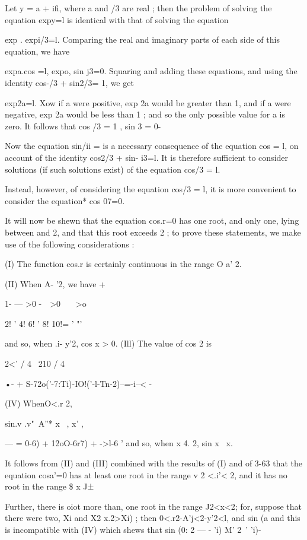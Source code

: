 Let y = a + ifi, where a and /3 are real ; then the problem of solving the equation 
expy=l is identical with that of solving the equation 

exp  . expi/3=l. 
Comparing the real and imaginary parts of each side of this equation, we have 

expa.cos =l, expo, sin j3=0. 
Squaring and adding these equations, and using the identity cos-/3 + sin2/3= 1, we get 

exp2a=l. 
Xow if a were positive, exp 2a would be greater than 1, and if a were negative, exp 2a 
would be less than 1 ; and so the only possible value for a is zero. 
It follows that cos /3 = 1 , sin 3 = 0- 

Now the equation sin/ii = is a necessary consequence of the equation cos  = l, on 
account of the identity cos2/3 + sin- i3=l. It is therefore sufficient to consider solutions 
(if such solutions exist) of the equation cos/3 = l. 

Instead, however, of considering the equation cos/3 = l, it is more convenient to 
consider the equation* cos 07=0. 

It will now be shewn that the equation cos.r=0 has one root, and only one, lying 
between and 2, and that this root exceeds  2 ; to prove these statements, we make use 
of the following considerations : 

(I) The function cos.r is certainly continuous in the range O a' 2. 

(II) When   A-  '2, we have + 

1- — >0 -\ \ >0 \ \ \ >o 

2!  ' 4! 6! ' 8! 10!=  ' "' 

and so, when  .i-   y'2, cos x > 0. 
(Ill) The value of cos 2 is 

2<' / 4 \ 210 / 4 \ 

•-  + S-72o('-7:Ti)-IO!('-l-Tn-2)--=-i--< - 

(IV) WhenO<.r 2, 

sin.v   .v"\ A''*   x  \ , x'   , 

— = 0-6) + 12oO-6r7) + ->l-6 ' 
and so, when   x 4. 2, sin x   \ x. 

It follows from (II) and (III) combined with the results of (I) and of   3-63 that the 
equation cosa'=0 has at least one root in the range v 2 <.i'< 2, and it has no root in the 
range \$ x   J± 

Further, there is oiot more than, one root in the range J2<x<2; for, suppose that 
there were two, Xi and X2 x.2>Xi) ; then 0<.r2-A'j<2-y'2<l, and 
sin (a%
and this is incompatible with (IV) which shews that sin (0: 2 — - 'i)  M' 2~' 'i)- 

